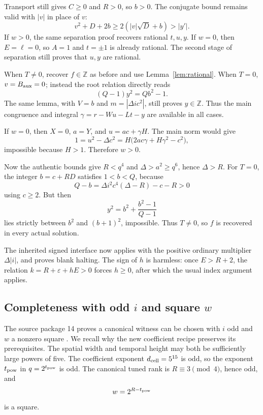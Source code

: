\documentclass[11pt]{article}
\theoremstyle{remark}\newtheorem{remark}[theorem]{Remark}
\newcommand{\Z}{\mathbb Z}
\begin{document}
Transport still gives \(C\ge0\) and \(R>0\), so \(b>0\).
The conjugate bound remains valid with \(|v|\) in place of \(v\):
\[
 v^2+D+2b\ge2(|v|\sqrt D+b)>|y'|.
\]
If \(w>0\), the same separation proof recovers rational \(t,u,y\).
If \(w=0\), then \(E=\ell=0\), so \(A=1\) and \(t=\pm1\) is
already rational. The second stage of separation still proves that
\(u,y\) are rational.

When \(T\ne0\), recover \(f\in\Z\) as before and use
Lemma~\ref{lem:rational}. When \(T=0\), \(v=B_{\rm aux}=0\);
instead the root relation directly reads
\[
 (Q-1)y^2=Qb^2-1.
\]
The same lemma, with \(V=b\) and \(m=|\Delta ic^2|\), still
proves \(y\in\Z\). Thus the main congruence and integral
\(\gamma=r-Wu-Lt-y\) are available in all cases.

If \(w=0\), then \(X=0\), \(a=Y\), and \(u=ac+\gamma H\).
The main norm would give
\[
 1=u^2-\Delta c^2
   =H\bigl(2ac\gamma+H\gamma^2-c^2\bigr),
\]
impossible because \(H>1\). Therefore \(w>0\).

Now the authentic bounds give \(R<q^4\) and
\(\Delta>a^2\ge q^6\), hence \(\Delta>R\).
For \(T=0\), the integer \(b=c+RD\) satisfies \(1<b<Q\), because
\[
 Q-b=\Delta i^2c^4(\Delta-R)-c-R>0
\]
using \(c\ge2\). But then
\[
 y^2=b^2+\frac{b^2-1}{Q-1}
\]
lies strictly between \(b^2\) and \((b+1)^2\), impossible.
Thus \(T\ne0\), so \(f\) is recovered in every actual solution.

The inherited signed interface now applies with the positive ordinary
multiplier \(\Delta|i|\), and proves blank halting. The sign of \(h\)
is harmless: once \(E>R+2\), the relation
\(k=R+\varepsilon+hE>0\) forces \(h\ge0\), after which the
usual index argument applies.

\subsection{Completeness with odd \texorpdfstring{\(i\)}{i} and square \texorpdfstring{\(w\)}{w}}

The source package 14 proves a canonical witness can be chosen with
\(i\) odd and \(w\) a nonzero square \cite{p14}. We recall why the new coefficient
recipe preserves its prerequisites.
The spatial width and temporal height may both be sufficiently large
powers of five. The coefficient exponent \(d_{\rm cell}=5^{15}\)
is odd, so the exponent \(t_{\rm pow}\) in \(q=2^{t_{\rm pow}}\)
is odd. The canonical tuned rank is \(R\equiv3\pmod4\), hence odd,
and
\[
 w=2^{R-t_{\rm pow}}
\]
is a square.
\end{document}
